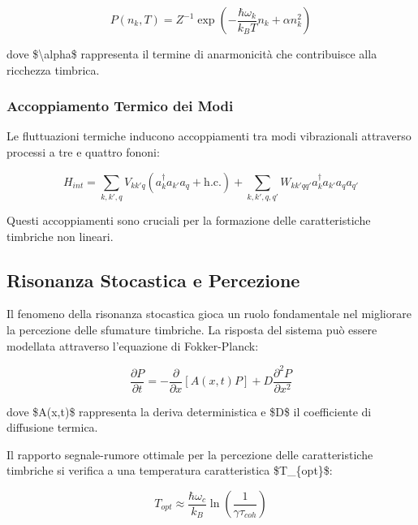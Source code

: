 \documentclass[a4paper,11pt]{article}
\begin{document}
\begin{displaymath}
P(n_k, T) = Z^{-1}\exp\left(-\frac{\hbar\omega_k}{k_BT}n_k + \alpha n_k^2\right)
\end{displaymath}

dove \$\textbackslash{}alpha\$ rappresenta il termine di anarmonicità che contribuisce
alla ricchezza timbrica.

\subsubsection{Accoppiamento Termico dei Modi}\hypertarget{accoppiamento-termico-dei-modi}{}\label{accoppiamento-termico-dei-modi}

Le fluttuazioni termiche inducono accoppiamenti tra modi vibrazionali
attraverso processi a tre e quattro fononi:

\begin{displaymath}
H_{int} = \sum_{k,k',q} V_{kk'q}(a_k^\dagger a_{k'} a_q + \text{h.c.}) +
    \sum_{k,k',q,q'} W_{kk'qq'}a_k^\dagger a_{k'} a_q a_{q'}
\end{displaymath}

Questi accoppiamenti sono cruciali per la formazione delle
caratteristiche timbriche non lineari.

\subsection{Risonanza Stocastica e Percezione}\hypertarget{risonanza-stocastica-e-percezione}{}\label{risonanza-stocastica-e-percezione}

Il fenomeno della risonanza stocastica gioca un ruolo fondamentale nel
migliorare la percezione delle sfumature timbriche. La risposta del
sistema può essere modellata attraverso l'equazione di Fokker-Planck:

\begin{displaymath}
\frac{\partial P}{\partial t} = -\frac{\partial}{\partial x}[A(x,t)P] + D\frac{\partial^2 P}{\partial x^2}
\end{displaymath}

dove \$A(x,t)\$ rappresenta la deriva deterministica e \$D\$ il coefficiente
di diffusione termica.

Il rapporto segnale-rumore ottimale per la percezione delle
caratteristiche timbriche si verifica a una temperatura caratteristica
\$T\_\{opt\}\$:

\begin{displaymath}
T_{opt} \approx \frac{\hbar\omega_c}{k_B}\ln\left(\frac{1}{\gamma\tau_{coh}}\right)
\end{displaymath}
\end{document}
